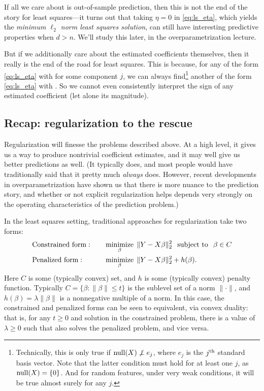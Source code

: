 \documentclass{article}
\begin{document}
If all we care about is out-of-sample prediction, then this is not the end of
the story for least squares---it turns out that taking $\eta=0$ in
\eqref{eq:ls_eta}, which yields the \emph{minimum $\ell_2$ norm least squares
  solution}, can still have interesting predictive properties when $d>n$. We'll
study this later, in the overparametrization lecture.   

But if we additionally care about the estimated coefficients themselves, then it
really is the end of the road for least squares. This is because, for any
\smash{$\hbeta$} of the form \eqref{eq:ls_eta} with  for
some component $j$, we can always find\footnote{Technically, this is only true
  if $\mathrm{null}(X) \not\perp e_j$, where $e_j$ is the $j^{\text{th}}$ standard basis
  vector. Note that the latter condition must hold for at least one $j$, as
  $\mathrm{null}(X) = \{0\}$. And for random features, under very weak conditions, it
  will be true almost surely for any $j$.} 
another \smash{$\tilde\beta$} of the form \eqref{eq:ls_eta} with
. So we cannot even consistently interpret the sign
of any estimated coefficient (let alone its magnitude). 

\subsection{Recap: regularization to the rescue}

Regularization will finesse the problems described above. At a high level, it
gives us a way to produce nontrivial coefficient estimates, and it may well give 
us better predictions as well. (It typically does, and most people would have
traditionally said that it pretty much \emph{always} does. However, recent
developments in overparametrization have shown us that there is more nuance to 
the prediction story, and whether or not explicit regularization helps depends
very strongly on the operating characteristics of the prediction problem.) 

In the least squares setting, traditional approaches for regularization take two
forms:  
\begin{alignat*}{3}
&\text{Constrained form}: \quad 
&&\mathop{\mathrm{minimize}}_\beta \; \|Y - X\beta\|_2^2 \;\; \mathop{\mathrm{subject\,\,to}} \;\; \beta \in C \\
&\text{Penalized form}: \quad 
&&\mathop{\mathrm{minimize}}_\beta \; \|Y - X\beta\|_2^2 + h(\beta).
\end{alignat*}
Here $C$ is some (typically convex) set, and $h$ is some (typically convex)
penalty function. Typically $C = \{\beta : \|\beta\| \leq t\}$ is the sublevel
set of a norm $\|\cdot\|$, and $h(\beta) = \lambda \|\beta\|$ is a nonnegative
multiple of a norm. In this case, the constrained and penalized forms can be 
seen to equivalent, via convex duality: that is, for any $t \geq 0$ and solution 
\smash{$\hbeta$} in the constrained problem, there is a value of $\lambda \geq
0$ such that \smash{$\hbeta$} also solves the penalized problem, and vice
versa. 
\end{document}
